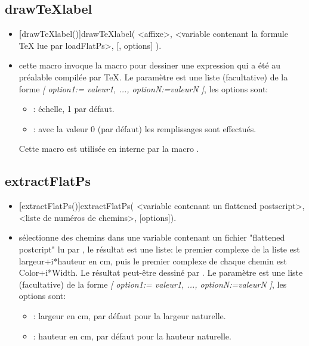 \subsection{drawTeXlabel}\label{macdrawTeXlabel}
\begin{itemize}
 \item \util \textbf[drawTeXlabel()]{drawTeXlabel( <affixe>, <variable contenant la formule TeX lue par loadFlatPs>, [, options] )}.
 \item \desc cette macro invoque la macro  pour dessiner une expression qui a été au préalable compilée par \TeX. Le paramètre  est une liste (facultative) de la forme \textsl{[ option1:= valeur1, ..., optionN:=valeurN ]}, les options sont:
  \begin{itemize}
  \item {}: échelle, 1 par défaut.
  \item {}: avec la valeur 0 (par défaut) les remplissages sont effectués.
  \end{itemize}
 Cette macro est utilisée en interne par la macro .
\end{itemize}

\subsection{extractFlatPs}\label{macextractFlatPs}
\begin{itemize}
 \item \util \textbf[extractFlatPs()]{extractFlatPs( <variable contenant un flattened postscript>, <liste de numéros de chemins>, [options])}.
 \item \desc sélectionne des chemins dans une variable contenant un fichier "flattened postcript" lu par , le résultat est une liste: le premier complexe de la liste est largeur+i*hauteur en cm, puis le premier complexe de chaque chemin est Color+i*Width. Le résultat peut-être dessiné par . Le paramètre  est une liste (facultative) de la forme \textsl{[ option1:= valeur1, ..., optionN:=valeurN ]}, les options sont:
  \begin{itemize}
  \item {}: largeur en cm, \Nil par défaut pour la largeur naturelle.
  \item {}: hauteur en cm, \Nil par défaut pour la hauteur naturelle.
  \end{itemize}
\end{itemize}


